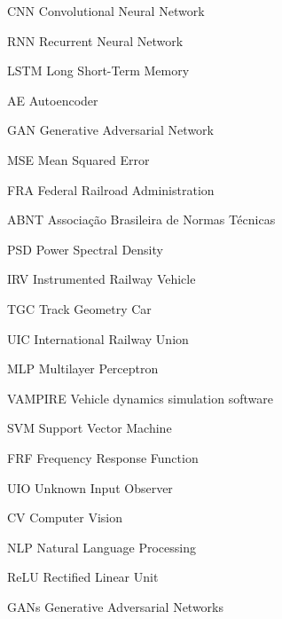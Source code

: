 \documentclass[
	oldfontcommands,
	sumario=abnt-6027-2012,
	12pt,			%
	openright,		%
	oneside,		%
	a4paper,		%
	english,		%
	brazil			%
	]{imecc-unicamp}
\begin{document}
\begin{siglas}
	\item[CNN] Convolutional Neural Network
	\item[RNN] Recurrent Neural Network
	\item[LSTM] Long Short-Term Memory
	\item[AE] Autoencoder
	\item[GAN] Generative Adversarial Network
	\item[MSE] Mean Squared Error
	\item[FRA] Federal Railroad Administration
	\item[ABNT] Associação Brasileira de Normas Técnicas 
	\item[PSD] Power Spectral Density
	\item[IRV] Instrumented Railway Vehicle
	\item[TGC] Track Geometry Car
	\item[UIC] International Railway Union
	\item[MLP] Multilayer Perceptron
	\item[VAMPIRE] Vehicle dynamics simulation software
	\item[SVM] Support Vector Machine
	\item[FRF] Frequency Response Function
	\item[UIO] Unknown Input Observer
	\item[CV] Computer Vision
	\item[NLP] Natural Language Processing
	\item[ReLU] Rectified Linear Unit
	\item[GANs] Generative Adversarial Networks
\end{siglas}
\end{document}
